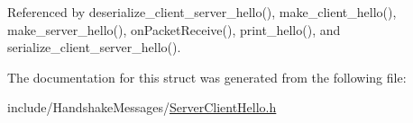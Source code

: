 Referenced by deserialize\+\_\+client\+\_\+server\+\_\+hello(), make\+\_\+client\+\_\+hello(), make\+\_\+server\+\_\+hello(), on\+Packet\+Receive(), print\+\_\+hello(), and serialize\+\_\+client\+\_\+server\+\_\+hello().



The documentation for this struct was generated from the following file\+:\begin{DoxyCompactItemize}
\item 
include/\+Handshake\+Messages/\hyperlink{_server_client_hello_8h}{Server\+Client\+Hello.\+h}\end{DoxyCompactItemize}
